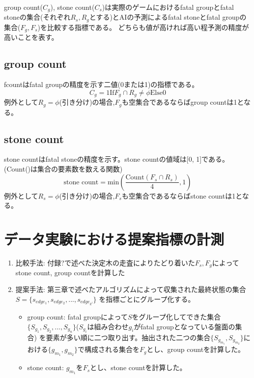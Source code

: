 group count($C_g$), stone count($C_s$)は実際のゲームにおけるfatal groupとfatal stoneの集合(それぞれ$R_s, R_g$とする)とAIの予測によるfatal stoneとfatal groupの集合($F_g, F_s$)を比較する指標である。
どちらも値が高ければ高い程予測の精度が高いことを表す。
\subsection{group count}
fcountはfatal groupの精度を示す二値(0または1)の指標である。
\begin{equation}
	{C_g = 1 \textrm{If} F_g \cap R_g \ne \phi \textrm{Else} 0}
\end{equation}
例外として$R_g=\phi$(引き分け)の場合,$F_g$も空集合であるならばgroup countは1となる。
\subsection{stone count}
stone countはfatal stoneの精度を示す。stone countの値域は[0, 1]である。
(Count()は集合の要素数を数える関数)
\begin{equation}
	{\textrm{stone count} = \textrm{min}(\frac{\textrm{Count}(F_s \cap R_s)}{4}, 1)  }
\end{equation}
例外として$R_s=\phi$(引き分け)の場合,$F_s$も空集合であるならばstone countは1となる。
\section{データ実験における提案指標の計測}

\begin{enumerate}
	\item 比較手法: 付録?で述べた決定木の走査によりたどり着いた$F_s, F_g$によってstone count, group countを計算した
	\item 提案手法: 第三章で述べたアルゴリズムによって収集された最終状態の集合$S=\{s_{edge_1}, s_{edge_2}, ..., s_{edge_{k^l}}\}$
	    を指標ごとにグループ化する。
		\begin{itemize}
			\item group count: fatal groupによって$S$をグループ化してできた集合$\{S_{g_1}, S_{g_2}, ..., S_{g_n}\}$($S_{g_i}$は組み合わせ$g_i$がfatal groupとなっている盤面の集合)
			を要素が多い順に二つ取り出す。抽出された二つの集合$\{S_{g_{m_1}}, S_{g_{m_2}}\}$における$\{g_{m_1}, g_{m_2}\}$で構成される集合を$F_g$とし、group countを計算した。
			\item stone count: $g_{m_1}$を$F_s$とし、stone countを計算した。
		\end{itemize}
		
\end{enumerate}

